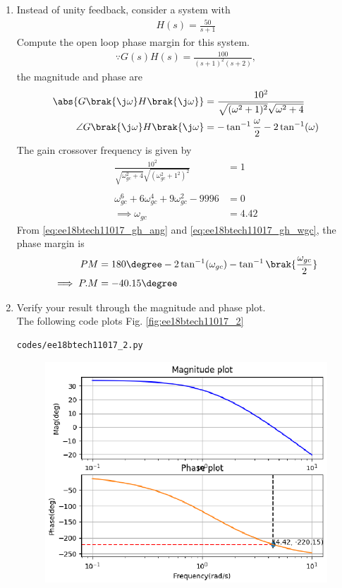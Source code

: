 \begin{enumerate}[label=\thesection.\arabic*.,ref=\thesection.\theenumi]
\item Instead of unity feedback, consider a system with 
%
\begin{align}
H(s)=\frac{50}{s+1}
\end{align}
%
Compute the open loop phase margin for this system.
\\
\solution 
%
\begin{align}
\because G(s)H(s)=\frac{100}{(s+1)^{2}(s+2)},
\label{eq:ee18btech11017_gh}
\end{align}
%
the  magnitude and phase are
\begin{align}
\label{eq:ee18btech11017_gh_mag}
\abs{G\brak{\j\omega}H\brak{\j\omega}}&=\frac{10^{2}}{ \sqrt{(\omega^{2}+1)^{2}}
\sqrt{\omega^{2}+4}} \\
\angle G\brak{\j\omega}H\brak{\j\omega}&=-\tan^{-1}\frac{\omega}{2}-2\tan^{-1}(\omega) 
\label{eq:ee18btech11017_gh_ang}
\end{align}
%
The gain crossover frequency is given by 
\begin{align}
\frac{10^{2}}{\sqrt{\omega_{gc}^{2}+4} \sqrt{(\omega_{gc}^{2}+1^{2})^{2}}}&=1 \\
\\
\omega_{gc}^{6}+6\omega_{gc}^{4}+9\omega_{gc}^{2}-9996&=0 
\\
\implies \omega_{gc} &= 4.42  
\label{eq:ee18btech11017_gh_wgc}
\end{align}
%
From \eqref{eq:ee18btech11017_gh_ang} and \eqref{eq:ee18btech11017_gh_wgc},
the phase margin is
\begin{align}
PM &=180\degree-2\tan^{-1}(\omega_{gc})-\tan^{-1}\brak{\frac{\omega_{gc}}{2}} \\
\implies  P.M &=-40.15\degree
\label{eq:ee18btech11017_gh_pm}
\end{align}
\item Verify your result through the magnitude and phase plot.
\\
\solution The following code plots Fig. \ref{fig:ee18btech11017_2}
\begin{lstlisting}
codes/ee18btech11017_2.py
\end{lstlisting}
\begin{figure}[!h]
  \includegraphics[width=\columnwidth]{./figs/ee18btech11017_2.eps}

\end{figure}
\end{enumerate}
